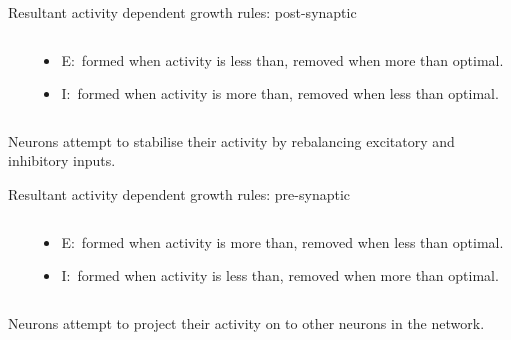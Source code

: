 \begin{frame}[c]{Resultant activity dependent growth rules: post-synaptic}
  \begin{columns}
    \begin{column}{0.6\textwidth}
      \centering
      \vspace{0.4cm}
      
    \end{column}
    \pause{}
    \begin{column}{0.5\textwidth}
      \begin{itemize}
        \item E:\ formed when activity is less than, removed when more than optimal.
        \item I:\ formed when activity is more than, removed when less than optimal.
      \end{itemize}
    \end{column}
  \end{columns}\vspace{-0.5cm}
  \pause{}
  \begin{center}
    Neurons attempt to \alert{stabilise their activity} by rebalancing excitatory and inhibitory inputs.
  \end{center}
\end{frame}
\begin{frame}[c]{Resultant activity dependent growth rules: pre-synaptic}
  \begin{columns}
    \begin{column}{0.6\textwidth}
      \centering
      \vspace{0.4cm}
      
    \end{column}
    \pause{}
    \begin{column}{0.5\textwidth}
      \begin{itemize}
        \item E:\ formed when activity is more than, removed when less than optimal.
        \item I:\ formed when activity is less than, removed when more than optimal.
      \end{itemize}
    \end{column}
  \end{columns}\vspace{-0.2cm}
  \pause{}
  \begin{center}
    Neurons attempt to \alert{project their activity} on to other neurons in the network.
  \end{center}
\end{frame}
